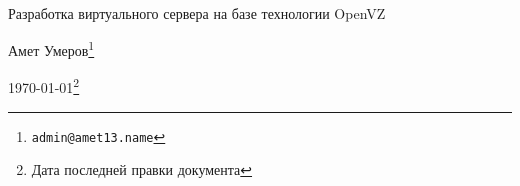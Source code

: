 
{~}\bigskip %

\begin{center}
\Huge{Разработка виртуального сервера на базе технологии OpenVZ} %

\vspace{1em}
\Large{Амет Умеров}\footnote{\texttt{admin@amet13.name}} %

\Large{\today}\footnote{Дата последней правки документа} %
\end{center}

\clearpage %
